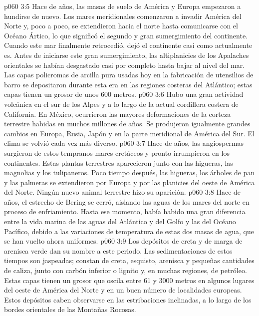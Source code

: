 \vs p060 3:5 \pc Hace  de años, las masas de suelo de América y Europa empezaron a hundirse de nuevo. Los mares meridionales comenzaron a invadir América del Norte y, poco a poco, se extendieron hacia el norte hasta comunicarse con el Océano Ártico, lo que significó el segundo y gran sumergimiento del continente. Cuando este mar finalmente retrocedió, dejó el continente casi como actualmente es. Antes de iniciarse este gran sumergimiento, las altiplanicies de los Apalaches orientales se habían desgastado casi por completo hasta bajar al nivel del mar. Las capas policromas de arcilla pura usadas hoy en la fabricación de utensilios de barro se depositaron durante esta era en las regiones costeras del Atlántico; estas capas tienen un grosor de unos 600 metros.
\vs p060 3:6 Hubo una gran actividad volcánica en el sur de los Alpes y a lo largo de la actual cordillera costera de California. En México, ocurrieron las mayores deformaciones de la corteza terrestre habidas en muchos millones de años. Se produjeron igualmente grandes cambios en Europa, Rusia, Japón y en la parte meridional de América del Sur. El clima se volvió cada vez más diverso.
\vs p060 3:7 \pc Hace  de años, las angiospermas surgieron de estos tempranos mares cretáceos y pronto irrumpieron en los continentes. Estas plantas terrestres aparecieron  junto con las higueras, las magnolias y los tulipaneros. Poco tiempo después, las higueras, los árboles de pan y las palmeras se extendieron por Europa y por las planicies del oeste de América del Norte. Ningún nuevo animal terrestre hizo su aparición.
\vs p060 3:8 \pc Hace  de años, el estrecho de Bering se cerró, aislando las aguas de los mares del norte en proceso de enfriamiento. Hasta ese momento, había habido una gran diferencia entre la vida marina de las aguas del Atlántico y del Golfo y las del Océano Pacífico, debido a las variaciones de temperatura de estas dos masas de agua, que se han vuelto ahora uniformes.
\vs p060 3:9 Los depósitos de creta y de marga de arenisca verde dan su nombre a este periodo. Las sedimentaciones de estos tiempos son jaspeadas; constan de creta, esquisto, arenisca y pequeñas cantidades de caliza, junto con carbón inferior o lignito y, en muchas regiones, de petróleo. Estas capas tienen un grosor que oscila entre 61 y 3000 metros en algunos lugares del oeste de América del Norte y en un buen número de localidades europeas. Estos depósitos caben observarse en las estribaciones inclinadas, a lo largo de los bordes orientales de las Montañas Rocosas.

